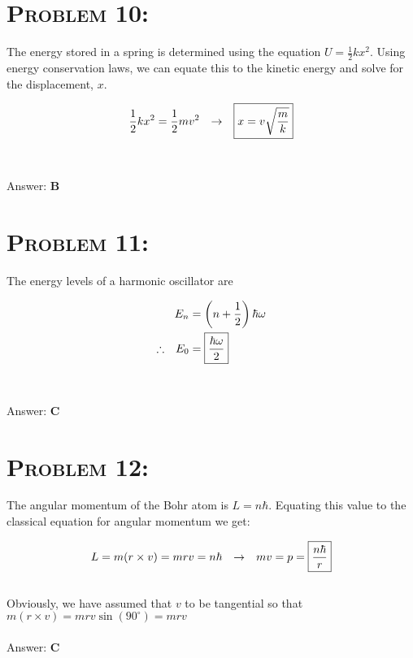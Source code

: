 \documentclass{article}
\begin{document}

\section{\textsc{Problem 10:}} The energy stored in a spring is determined using the equation $U = \frac{1}{2} k x^2$. Using energy conservation laws, we can equate this to the kinetic energy and solve for the displacement, $x$.

\begin{align}
 \frac{1}{2} k x^2 =   \frac{1}{2} m v^2 \hspace{.1in} \rightarrow \hspace{.1in}
 \boxed{x=v{\sqrt\frac{m}{k}}}
\end{align}
\\\\
Answer: \textbf{\textcolor{ProcessBlue}B}\\


\section{\textsc{Problem 11:}} The energy levels of a harmonic oscillator are

\begin{align}
E_n &= \left(n+\frac{1}{2}\right)\hbar\omega\\
\therefore \hspace{.1in} E_0 &= \boxed{\frac{\hbar\omega}{2}}\nonumber
\end{align}
\\\\
Answer: \textbf{\textcolor{ProcessBlue}C}\\


\section{\textsc{Problem 12:}} The angular momentum of the Bohr atom is $L = n\hbar$. Equating this value to the classical equation for angular momentum we get:

\begin{align}
L = m(r \times v) = mrv = n\hbar \hspace{.1in}  \rightarrow \hspace{.1in}  mv = p = \boxed{\frac{n\hbar}{r}}
\end{align}
\\
Obviously, we have assumed that $v$ to be tangential so that $m(r \times v) = m r v \sin{(90^{\circ})} = mrv$
\\\\
Answer: \textbf{\textcolor{ProcessBlue}C}\\
\end{document}
